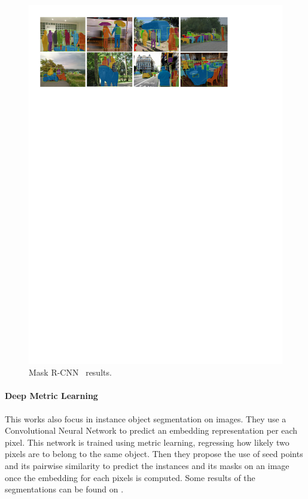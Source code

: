 \begin{figure}[h]
  \centering
  \includegraphics[width=1.\linewidth]{figures/maskrcnn/results.pdf}
  \caption{Mask R-CNN~\cite{he2017mask} results. }
  \label{fig:maskrcnn}
\end{figure}

\paragraph{Deep Metric Learning~\deepml}
This works also focus in instance object segmentation on images.
They use a Convolutional Neural Network to predict an embedding representation per each pixel.
This network is trained using metric learning, regressing how likely two pixels are to belong to the same object.
Then they propose the use of seed points and its pairwise similarity to predict the instances and its masks on an image once the embedding for each pixels is computed.
Some results of the segmentations can be found on .

